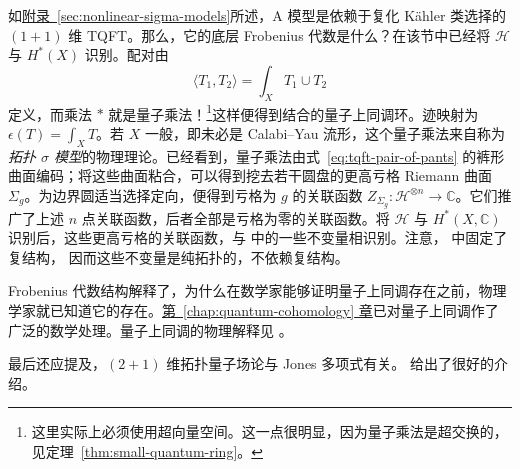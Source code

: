  如\hyperref[sec:nonlinear-sigma-models]{附录~\ref*{sec:nonlinear-sigma-models}}所述，A 模型是依赖于复化 Kähler 类选择的 $(1+1)$ 维 TQFT。那么，它的底层 Frobenius 代数是什么？在该节中已经将 $\mathcal H$ 与 $H^*(X)$ 识别。配对由
\[
\langle T_1,T_2\rangle=\int_XT_1\cup T_2
\]
定义，而乘法 $*$ 就是量子乘法！\footnote{这里实际上必须使用超向量空间。这一点很明显，因为量子乘法是超交换的，见定理~\ref{thm:small-quantum-ring}。}这样便得到结合的量子上同调环。迹映射为 $\epsilon(T)=\int_XT$。若 $X$ 一般，即未必是 Calabi--Yau 流形，这个量子乘法来自称为\emph{拓扑 $\sigma$ 模型}的物理理论。已经看到，量子乘法由式~\eqref{eq:tqft-pair-of-pants} 的裤形曲面编码；将这些曲面粘合，可以得到挖去若干圆盘的更高亏格 Riemann 曲面 $\Sigma_g$。为边界圆适当选择定向，便得到亏格为 $g$ 的关联函数 $Z_{\Sigma_g}:\mathcal H^{\otimes n}\to\mathbb C$。它们推广了上述 $n$ 点关联函数，后者全部是亏格为零的关联函数。将 $\mathcal H$ 与 $H^*(X,\mathbb C)$ 识别后，这些更高亏格的关联函数，与  中的一些不变量相识别。注意， 中固定了复结构，
因而这些不变量是纯拓扑的，不依赖复结构。

Frobenius 代数结构解释了，为什么在数学家能够证明量子上同调存在之前，物理学家就已知道它的存在。\hyperref[chap:quantum-cohomology]{第~\ref*{chap:quantum-cohomology} 章}已对量子上同调作了广泛的数学处理。量子上同调的物理解释见 。

最后还应提及，$(2+1)$ 维拓扑量子场论与 Jones 多项式有关。 给出了很好的介绍。
\par\endgroup
